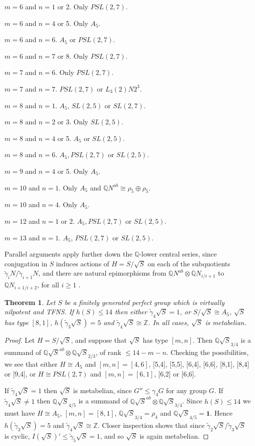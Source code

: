 \documentclass[12pt]{amsart}
\renewcommand{\geq}{\geqslant}
\renewcommand{\leq}{\leqslant}
\newtheorem{theorem}{Theorem}
\begin{document}
$m=6$ and $n=1$ or 2. Only $PSL(2,7)$.

$m=6$ and $n=4$ or 5. Only  $A_5$.

$m=6$ and $n=6$.  $A_5$ or $PSL(2,7)$.

$m=6$ and $n=7$ or 8.  Only $PSL(2,7)$.

$m=7$ and $n=6$.  Only $PSL(2,7)$.

$m=7$ and $n=7$.  $PSL(2,7)$ or $L_3(2)N2^3$.

$m=8$ and $n=1$.  $A_5$, $SL(2,5)$ or $SL(2,7)$.

$m=8$ and $n=2$ or 3.  Only $SL(2,5)$.

$m=8$ and $n=4$ or 5.  $A_5$ or $SL(2,5)$.

$m=8$ and $n=6$. $A_5, PSL(2,7)$ or $SL(2,5)$.
 
$m=9$ and $n=4$ or 5.  Only $A_5$.

$m=10$ and $n=1$. Only $A_5$ and $\mathbb{Q}N^{ab}\cong\rho_5\oplus\rho_5$.

$m=10$ and $n=4$. Only $A_5$.

$m=12$ and $n=1$ or 2.  $A_5, PSL(2,7)$ or $SL(2,5)$.

$m=13$ and $n=1$.  $A_5$, $PSL(2,7)$ or $SL(2,5)$.

Parallel arguments apply further down the $\mathbb{Q}$-lower central series,
since conjugation in $S$ induces actions of $H=S/\sqrt{S}$ on each of the subquotients
$\tilde\gamma_iN/\tilde\gamma_{i+1}N$, and 
there are natural epimorphisms from 
$\mathbb{Q}N^{ab}\otimes\mathbb{Q}N_{i/i+1}$ to $\mathbb{Q}N_{i+1/i+2}$,
for all $i\geq1$ \cite[5.2.5]{Ro}. 

\begin{theorem}
\label{vmetab}
Let $S$ be a finitely generated perfect group which is virtually nilpotent and TFNS.
If $h(S)\leq14$ then either $\tilde\gamma_4\sqrt{S}=1$,
or $S/\sqrt{S}\cong{A_5}$,  $\sqrt{S}$ has type $[8,1]$, 
$h(\tilde\gamma_3\sqrt{S})=5$
and $\tilde\gamma_4\sqrt{S}\cong\mathbb{Z}$.
In all cases,  $\sqrt{S}$ is metabelian.
\end{theorem}

\begin{proof}
Let $H=S/\sqrt{S}$, and suppose that $\sqrt{S}$ has type $[m,n]$.
Then $\mathbb{Q}\sqrt{S}_{3/4}$ is a summand of 
$\mathbb{Q}\sqrt{S}^{ab}\otimes\mathbb{Q}\sqrt{S}_{2/3}$, 
of rank $\leq14-m-n$.
Checking the possibilities, we see that either $H\cong{A_5}$ and $[m,n]=[4,6]$,
[5,4], [5,5],  [6,4],  [6,6], [8,1], [8,4] or [9,4],
or $H\cong{PSL(2,7)}$ and $[m,n]=[6,1]$, [6,2] or [6,6].

If $\tilde\gamma_4\sqrt{S}=1$ then $\sqrt{S}$ is metabelian,
since  $G''\leq\gamma_4G$ for any group $G$.
If $\tilde\gamma_4\sqrt{S}\not=1$ then 
$\mathbb{Q}\sqrt{S}_{4/5}$ is a summand of
$\mathbb{Q}\sqrt{S}^{ab}\otimes\mathbb{Q}\sqrt{S}_{3/4}$.
Since $h(S)\leq14$ we must have $H\cong{A_5}$, $[m,n]=[8,1]$,  
${\mathbb{Q}\sqrt{S}_{3/4}=\rho_4}$ and $\mathbb{Q}\sqrt{S}_{4/5}=\mathbf{1}$.
Hence $h(\tilde\gamma_3\sqrt{S})=5$ and $\tilde\gamma_4\sqrt{S}\cong\mathbb{Z}$.
Closer inspection shows that since 
$\tilde\gamma_2\sqrt{S}/\tilde\gamma_3\sqrt{S}$ is cyclic,
$I(\sqrt{S})'\leq\tilde\gamma_5\sqrt{S}=1$, and so $\sqrt{S}$ is again metabelian.
\end{proof}
\end{document}
